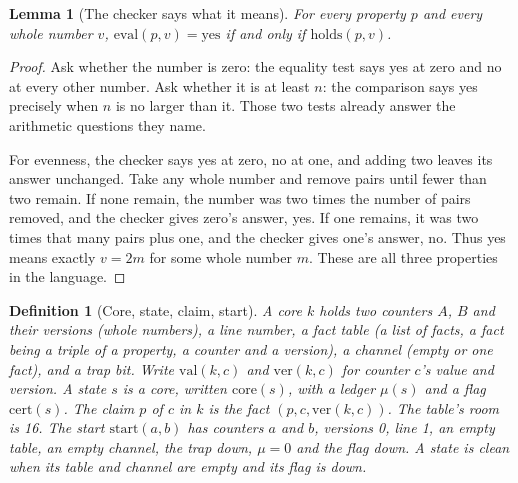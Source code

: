 \documentclass[11pt,twoside]{article}
\theoremstyle{thielethm}
\newtheorem{lemma}[theorem]{Lemma}
\theoremstyle{thieledef}
\newtheorem{definition}{Definition}[section]
\theoremstyle{thieledef}
\theoremstyle{thieledef}
\theoremstyle{thielethm}
\theoremstyle{thieleobs}
\theoremstyle{thielethm}
\begin{document}
\begin{lemma}[The checker says what it means]\label{lem:u34-eval}
For every property $p$ and every whole number $v$, $\mathrm{eval}(p, v) = \mathrm{yes}$ if
and only if $\mathrm{holds}(p, v)$.
\end{lemma}

\begin{proof}
Ask whether the number is zero: the equality test says yes at zero and no
at every other number. Ask whether it is at least $n$: the comparison says
yes precisely when $n$ is no larger than it. Those two tests already answer
the arithmetic questions they name.

For evenness, the checker says yes at zero, no at one, and adding two leaves
its answer unchanged. Take any whole number and remove pairs until fewer
than two remain. If none remain, the number was two times the number of
pairs removed, and the checker gives zero's answer, yes. If one remains,
it was two times that many pairs plus one, and the checker gives one's
answer, no. Thus yes means exactly $v=2m$ for some whole number $m$.
These are all three properties in the language.
\end{proof}

\begin{definition}[Core, state, claim, start]\label{def:u34-state}
A \emph{core} $k$ holds two counters $A$, $B$ and their versions (whole numbers), a line number,
a fact table (a list of facts, a fact being a triple of a property, a counter and a
version), a channel (empty or one fact), and a trap bit. Write $\mathrm{val}(k, c)$ and
$\mathrm{ver}(k, c)$ for counter $c$'s value and version. A \emph{state} $s$ is a core, written
$\mathrm{core}(s)$, with a ledger $\mu(s)$ and a flag $\mathrm{cert}(s)$. The \emph{claim} $p$ of
$c$ in $k$ is the fact $(p, c, \mathrm{ver}(k, c))$. The table's room is 16. The start
$\mathrm{start}(a, b)$ has counters $a$ and $b$, versions 0, line 1, an empty table, an
empty channel, the trap down, $\mu = 0$ and the flag down. A state is \emph{clean} when its
table and channel are empty and its flag is down.
\end{definition}
\end{document}
